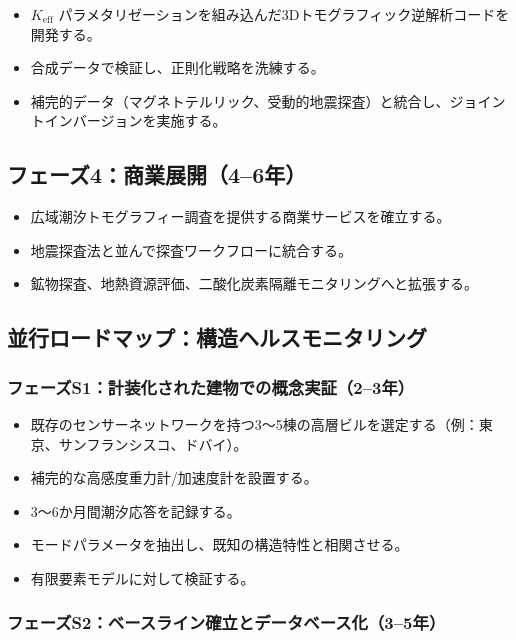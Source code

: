 \documentclass[12pt,a4paper]{article}
\theoremstyle{remark}
\newcommand{\Keff}{K_{\mathrm{eff}}}
\begin{document}
	\begin{itemize}
		\item \(\Keff\) パラメタリゼーションを組み込んだ3Dトモグラフィック逆解析コードを開発する。
		\item 合成データで検証し、正則化戦略を洗練する。
		\item 補完的データ（マグネトテルリック、受動的地震探査）と統合し、ジョイントインバージョンを実施する。
	\end{itemize}
	
	\subsection{フェーズ4：商業展開（4–6年）}
	
	\begin{itemize}
		\item 広域潮汐トモグラフィー調査を提供する商業サービスを確立する。
		\item 地震探査法と並んで探査ワークフローに統合する。
		\item 鉱物探査、地熱資源評価、二酸化炭素隔離モニタリングへと拡張する。
	\end{itemize}
	
	\subsection{並行ロードマップ：構造ヘルスモニタリング}
	
	\subsubsection{フェーズS1：計装化された建物での概念実証（2–3年）}
	
	\begin{itemize}
		\item 既存のセンサーネットワークを持つ3～5棟の高層ビルを選定する（例：東京、サンフランシスコ、ドバイ）。
		\item 補完的な高感度重力計/加速度計を設置する。
		\item 3～6か月間潮汐応答を記録する。
		\item モードパラメータを抽出し、既知の構造特性と相関させる。
		\item 有限要素モデルに対して検証する。
	\end{itemize}
	
	\subsubsection{フェーズS2：ベースライン確立とデータベース化（3–5年）}
	
\end{document}
